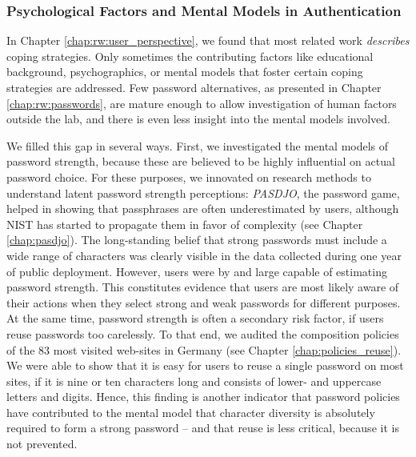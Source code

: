 \subsubsection{Psychological Factors and Mental Models in Authentication}
In Chapter \ref{chap:rw:user_perspective}, we found that most related work \textit{describes} coping strategies. Only sometimes the contributing factors like educational background, psychographics, or mental models that foster certain coping strategies are addressed. Few password alternatives, as presented in Chapter \ref{chap:rw:passwords}, are mature enough to allow investigation of human factors outside the lab, and there is even less insight into the mental models involved. 

We filled this gap in several ways. First, we investigated the mental models of password strength, because these are believed to be highly influential on actual password choice. For these purposes, we innovated on research methods to understand latent password strength perceptions: \textit{PASDJO}, the password game, helped in showing that passphrases are often underestimated by users, although \gls{NIST} has started to propagate them in favor of complexity (see Chapter \ref{chap:pasdjo}). The long-standing belief that strong passwords must include a wide range of characters was clearly visible in the data collected during one year of public deployment. However, users were by and large capable of estimating password strength. This constitutes evidence that users are most likely aware of their actions when they select strong and weak passwords for different purposes. At the same time, password strength is often a secondary risk factor, if users reuse passwords too carelessly. 
To that end, we audited the composition policies of the 83 most visited web-sites in Germany (see Chapter \ref{chap:policies_reuse}). We were able to show that it is easy for users to reuse a single password on most sites, if it is nine or ten characters long and consists of lower- and uppercase letters and digits. Hence, this finding is another indicator that password policies have contributed to the mental model that character diversity is absolutely required to form a strong password -- and that reuse is less critical, because it is not prevented. 

